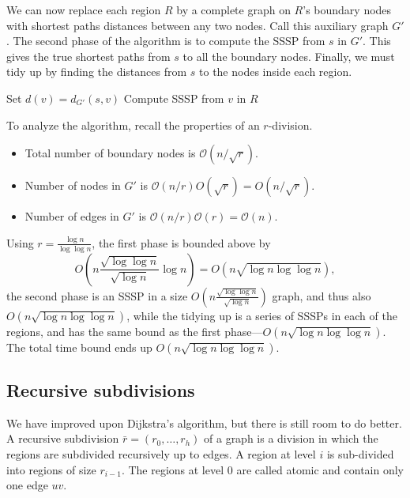 \documentclass[12pt]{article}
\begin{document}
 We can now replace each region $R$ by a complete graph on $R$'s boundary nodes with shortest paths distances between any two nodes. Call this auxiliary graph $G'$. The second phase of the algorithm is to compute the SSSP from $s$ in $G'$. This gives the true shortest paths from $s$ to all the boundary nodes. Finally, we must tidy up by finding the distances from $s$ to the nodes inside each region.

\begin{algorithm}[!htb]
  \label{alg:sssp-full}
  \begin{algorithmic}
        \State Set $d(v) = d_{G'}(s,v)$
        \State Compute SSSP from $v$ in $R$
      \EndFor
    \EndFor
  \end{algorithmic}
\end{algorithm}

To analyze the algorithm, recall the properties of an $r$-division.
\begin{itemize}
\item Total number of boundary nodes is $\mathcal{O}(n/\sqrt{r})$.
\item Number of nodes in $G'$ is $\mathcal{O}(n/r)O(\sqrt{r})=O(n/\sqrt{r})$.
\item Number of edges in $G'$ is $\mathcal{O}(n/r)\mathcal{O}(r) = \mathcal{O}(n)$.
\end{itemize}

Using $r=\frac{\log n}{\log \log n}$, the first phase is bounded above by
\[
  O\left(n\frac{\sqrt{\log \log n}}{\sqrt{\log n}} \log n\right)= O(n \sqrt{\log n \log \log n}),
\]
the second phase is an SSSP in a size $O(n \frac{\sqrt{\log \log n}}{\sqrt{\log n}})$ graph, and thus also $O(n \sqrt{\log n \log \log n})$, while the tidying up is a series of SSSPs in each of the regions, and has the same bound as the first phase---$O(n \sqrt{\log n \log \log n})$. The total time bound ends up $O(n \sqrt{\log n \log \log n})$.

\subsection{Recursive subdivisions}
\label{sec:recursion}

We have improved upon Dijkstra's algorithm, but there is still room to do better. A recursive subdivision $\bar{r} = (r_0, \ldots, r_h)$ of a graph is a division in which the regions are subdivided recursively up to edges. A region at level $i$ is sub-divided into regions of size $r_{i-1}$. The regions at level $0$ are called atomic and contain only one edge $uv$.
\end{document}
